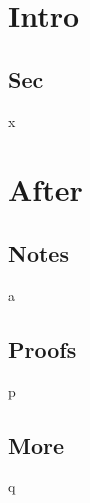 \documentclass{book}
\begin{document}
\mainmatter
\chapter{Intro}
\section{Sec}
x
\backmatter
\chapter{After}
\section{Notes}
a
\appendix
\section{Proofs}
p
\appendix
\section{More}
q
\end{document}

